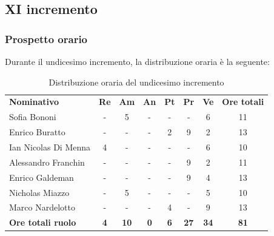 \documentclass[../piano-di-progetto.tex]{subfiles}
\begin{document}
  \subsection{XI incremento}

  \subsubsection{Prospetto orario}
 Durante il undicesimo incremento, la distribuzione oraria è la seguente:
  \begin{table}[H]
    \centering
    \begin{tabular}{lccccccc}
    \rowcolor{lightgray}
    \textbf{Nominativo}       & \textbf{Re} & \textbf{Am} & \textbf{An} & \textbf{Pt} & \textbf{Pr} & \textbf{Ve} & \textbf{Ore totali} \\
Sofia Bononi              & -          & 5           & -          & -          & -           & 6           & 11          \\
Enrico Buratto            & -          & -           & -          & 2          & 9           & 2           & 13          \\
Ian Nicolas Di Menna      & 4          & -           & -          & -          & -           & 6           & 10          \\
Alessandro Franchin       & -          & -           & -          & -          & 9           & 2           & 11          \\
Enrico Galdeman           & -          & -           & -          & -          & 9           & 4           & 13          \\
Nicholas Miazzo           & -          & 5           & -          & -          & -           & 5           & 10          \\
Marco Nardelotto          & -          & -           & -          & 4          & -           & 9           & 13          \\
\textbf{Ore totali ruolo} & \textbf{4} & \textbf{10} & \textbf{0} & \textbf{6} & \textbf{27} & \textbf{34} & \textbf{81}
    
    \end{tabular}
    \caption{Distribuzione oraria del undicesimo incremento}
  \end{table}
\end{document}
